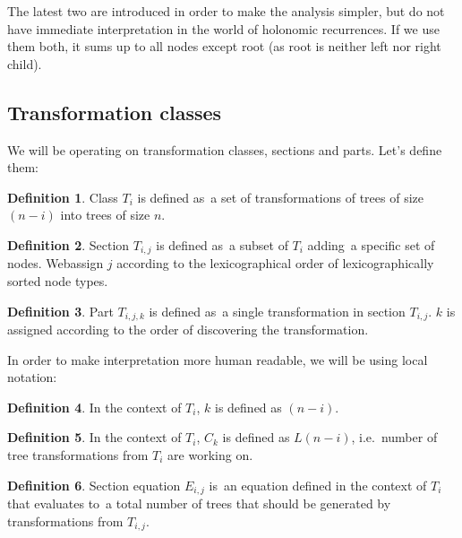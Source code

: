 \documentclass[final]{article}
\theoremstyle{definition}
\newtheorem{definition}{Definition}[subsection]
\theoremstyle{definition}
\theoremstyle{remark}
\begin{document}
The latest two are introduced in order to make the analysis simpler, but do not have immediate interpretation in the world of holonomic recurrences. If we use them both, it sums up to all nodes except root (as root is neither left nor right child).


\subsection{Transformation classes}%
\label{sub:transformation_classes}

We will be operating on transformation classes, sections and parts. Let's define them:

\begin{definition}
    Class \(T_i\) is defined as~a set of transformations of trees of size \((n - i)\) into trees of size \(n\).
\end{definition}

\begin{definition}
    Section \(T_{i,j}\) is defined as~a subset of \(T_i\) adding~a specific set of nodes. Webassign \(j\) according to the lexicographical order of lexicographically sorted node types.
\end{definition}

\begin{definition}
    Part \(T_{i,j,k}\) is defined as~a single transformation in section \(T_{i,j}\). \(k\) is assigned according to the order of discovering the transformation.
\end{definition}

In order to make interpretation more human readable, we will be using local notation:

\begin{definition}
    In the context of \(T_i\), \(k\) is defined as \((n - i)\).
\end{definition}

\begin{definition}
    In the context of \(T_i\), \(C_k\) is defined as \(L(n - i)\), i.e.~number of tree transformations from \(T_i\) are working on.
\end{definition}

\begin{definition}
    Section equation \(E_{i, j}\) is~an equation defined in the context of \(T_i\) that evaluates to~a total number of trees that should be generated by transformations from \(T_{i, j}\).
\end{definition}
\end{document}
